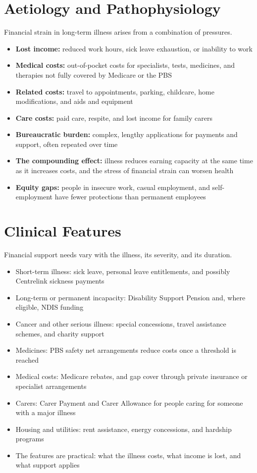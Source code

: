 \section*{Aetiology and Pathophysiology}
Financial strain in long-term illness arises from a combination of pressures.
\begin{itemize}
    \item \textbf{Lost income:} reduced work hours, sick leave exhaustion, or inability to work
    \item \textbf{Medical costs:} out-of-pocket costs for specialists, tests, medicines, and therapies not fully covered by Medicare or the PBS
    \item \textbf{Related costs:} travel to appointments, parking, childcare, home modifications, and aids and equipment
    \item \textbf{Care costs:} paid care, respite, and lost income for family carers
    \item \textbf{Bureaucratic burden:} complex, lengthy applications for payments and support, often repeated over time
    \item \textbf{The compounding effect:} illness reduces earning capacity at the same time as it increases costs, and the stress of financial strain can worsen health
    \item \textbf{Equity gaps:} people in insecure work, casual employment, and self-employment have fewer protections than permanent employees
\end{itemize}

\section*{Clinical Features}
Financial support needs vary with the illness, its severity, and its duration.
\begin{itemize}
    \item Short-term illness: sick leave, personal leave entitlements, and possibly Centrelink sickness payments
    \item Long-term or permanent incapacity: Disability Support Pension and, where eligible, NDIS funding
    \item Cancer and other serious illness: special concessions, travel assistance schemes, and charity support
    \item Medicines: PBS safety net arrangements reduce costs once a threshold is reached
    \item Medical costs: Medicare rebates, and gap cover through private insurance or specialist arrangements
    \item Carers: Carer Payment and Carer Allowance for people caring for someone with a major illness
    \item Housing and utilities: rent assistance, energy concessions, and hardship programs
    \item The features are practical: what the illness costs, what income is lost, and what support applies
\end{itemize}

